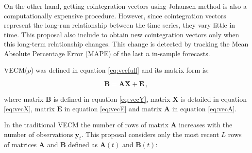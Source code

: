 On the other hand, getting cointegration vectors using Johansen method is also a
computationally expensive procedure. However, since cointegration vectors
represent the long-run relationship between the time series, they vary little in
time. This proposal also include to obtain new cointegration vectors only when
this long-term relationship changes. This change is detected by tracking the
Mean Absolute Percentage Error (MAPE) of the last $n$ in-sample forecasts.

% 
%






VECM($p$) was defined in equation \ref{eq:vecfull} and its matrix form is:

\begin{equation}\label{eq:vareq}
\mathbf{B} = 
\mathbf{A} \mathbf{X} + 
\mathbf{E} \, , 
\end{equation}

\noindent where matrix $\mathbf{B}$ is defined in equation
\ref{eq:vecY}, matrix $\mathbf{X}$ is detailed in equation \ref{eq:vecX}, matrix
$\mathbf{E}$ in equation \ref{eq:vecE} and matrix $\mathbf{A}$ in equation \ref{eq:vecA}.

In the traditional VECM the number of rows of matrix $\mathbf{A}$ increases with the number of
observations $\mathbf{y}_t$. This proposal considers only the most recent $L$
rows of matrices $\mathbf{A}$ and $\mathbf{B}$ defined as  $\mathbf{A}(t)$ and
$\mathbf{B}(t)$:

